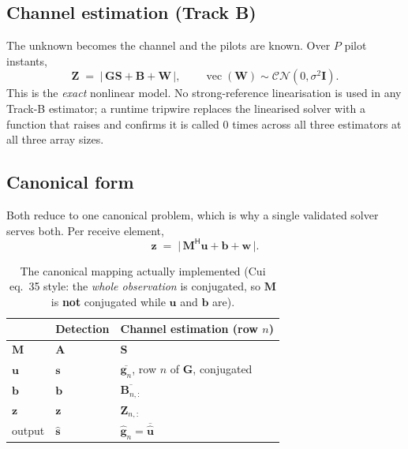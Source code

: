 \documentclass[11pt,a4paper]{article}
\newcommand{\CN}{\mathcal{CN}}
\newcommand{\herm}{\mathsf{H}}
\newcommand{\mat}[1]{\mathbf{#1}}
\newcommand{\vect}[1]{\mathbf{#1}}
\newcommand{\vecop}{\operatorname{vec}}
\begin{document}
\subsection{Channel estimation (Track B)}
The unknown becomes the channel and the pilots are known. Over $P$ pilot
instants,
\begin{equation}
\mat{Z} \;=\; \bigl|\,\mat{G}\mat{S} + \mat{B} + \mat{W}\,\bigr|,
\qquad \vecop(\mat{W})\sim\CN(0,\sigma^2\mat{I}).
\label{eq:obsB}
\end{equation}
This is the \emph{exact} nonlinear model. No strong-reference linearisation is
used in any Track-B estimator; a runtime tripwire replaces the linearised
solver with a function that raises and confirms it is called $0$ times across
all three estimators at all three array sizes.

\subsection{Canonical form}
Both reduce to one canonical problem, which is why a single validated solver
serves both. Per receive element,
\begin{equation}
\vect{z} \;=\; \bigl|\,\mat{M}^{\herm}\vect{u} + \vect{b} + \vect{w}\,\bigr| .
\label{eq:canonical}
\end{equation}

\begin{table}[h]
\centering
\begin{tabular}{@{}lll@{}}
\toprule
 & \textbf{Detection} & \textbf{Channel estimation (row $n$)}\\
\midrule
$\mat{M}$ & $\mat{A}$ & $\mat{S}$\\
$\vect{u}$ & $\vect{s}$ & $\overline{\vect{g}_n}$, row $n$ of $\mat{G}$, conjugated\\
$\vect{b}$ & $\vect{b}$ & $\overline{\mat{B}_{n,:}}$\\
$\vect{z}$ & $\vect{z}$ & $\mat{Z}_{n,:}$\\
output & $\hat{\vect{s}}$ & $\hat{\vect{g}}_n = \overline{\hat{\vect{u}}}$\\
\bottomrule
\end{tabular}
\caption{The canonical mapping actually implemented (Cui eq.~35 style: the
\emph{whole observation} is conjugated, so $\mat{M}$ is \textbf{not}
conjugated while $\vect{u}$ and $\vect{b}$ are).}
\end{table}
\end{document}
